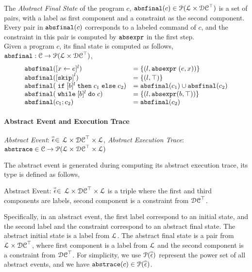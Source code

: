 The \emph{Abstract Final State} of the program $c$, 
$\mathtt{abs}{\mathtt{final}}(c) \in \mathcal{P}(\mathcal{L} \times \mathcal{DC}^{\top})$
is a set of pairs, with a label as first component and a constraint as the second component.
Every pair in $\mathtt{abs}{\mathtt{final}}(c)$ corresponds to a labeled command of $c$,
and the constraint in this pair is computed by $\mathtt{abs}{\mathtt{expr}}$ in the first step.
\\
Given a program $c$, its final state is computed as follows,
$\mathtt{abs}{\mathtt{final}}: \mathcal{C} \to \mathcal{P}(\mathcal{L} \times \mathcal{DC}^{\top})$,
 \[
  \begin{array}{ll}
    \absfinal(\clabel{\assign{x}{\expr}}{}^l)  & = \{(l, \absexpr\eapp (\expr, x))\}  \\
     \absfinal(\clabel{\eskip}^{l})  
     & = \{(l, \top)\} \\
     \absfinal(\eif [b]^l \ethen c_1 \eelse c_2)  & = \absfinal(c_1) \cup \absfinal(c_2) \\
     \absfinal(\ewhile [b]^l \edo c)  & = \{(l, \absexpr(\bexpr, \top))\} \\
     \absfinal(c_1 ; c_2)  & =  \absfinal(c_2) \\
 \end{array}
 \]
 \paragraph{Abstract Event and Execution Trace} 
 \emph{Abstract Event}: 
   $\stackrel{\scriptscriptstyle{\alpha}}{\mathtt{\epsilon}{}} \in $
   $\mathcal{L} \times \mathcal{DC}^{\top} \times \mathcal{L}$,
   \emph{Abstract Execution Trace}: $\mathtt{abs}{\mathtt{trace}} \in \mathcal{C} \to \mathcal{P}( \mathcal{L} \times \mathcal{DC}^{\top} \times \mathcal{L} )$

 The abstract event is generated during computing its abstract execution trace, its type is defined as follows,
 \begin{defn}
   \label{def:abs_event}
   Abstract Event: 
   $\stackrel{\scriptscriptstyle{\alpha}}{\mathtt{\epsilon}{}} \in $
   $\mathcal{L} \times \mathcal{DC}^{\top} \times \mathcal{L}$
   is a 
   triple where the first and third components are labels,
   second component is a constraint from $\mathcal{DC}^{\top}$.
   \end{defn}
   Specifically, in an abstract event, 
   the first label correspond to an initial state, and 
   the second label and the constraint correspond to an abstract final state.
  The abstract initial state is a label from $\mathcal{L}$.
 The abstract final state is a pair from $\mathcal{L} \times \mathcal{DC}^{\top}$,  
 where first component is a label from $\mathcal{L}$ and the second component is a constraint from $\mathcal{DC}^{\top}$.
 For simplicity, we use $\mathcal{P}(\stackrel{\scriptscriptstyle{\alpha}}{\mathtt{\epsilon}{}})$ represent the power set of all abstract events, and we have $\mathtt{abs}{\mathtt{trace}}(c) \in \mathcal{P}(\stackrel{\scriptscriptstyle{\alpha}}{\mathtt{\epsilon}{}})$.

